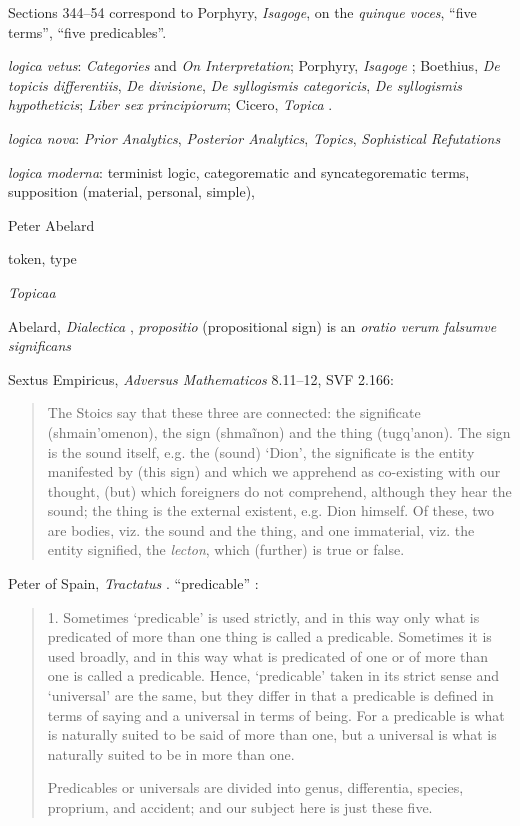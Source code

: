 \documentclass{article}
\newcommand{\textgreek}[1]{\begingroup\fontencoding{LGR}\selectfont#1\endgroup}
\begin{document}
Sections 344--54 correspond to Porphyry, {\em Isagoge}, on the {\em quinque voces}, ``five terms'', ``five predicables''.










{\em logica vetus}: {\em Categories} and {\em On Interpretation}; Porphyry, {\em Isagoge} \cite{isagoge}; Boethius, {\em De topicis differentiis},
{\em De divisione}, {\em De syllogismis categoricis}, {\em De syllogismis hypotheticis}; {\em Liber sex principiorum};  Cicero, {\em Topica} \cite{reinhardt}.

{\em logica nova}: {\em Prior Analytics}, {\em Posterior Analytics}, {\em Topics}, {\em Sophistical Refutations}

{\em logica moderna}: terminist logic, categorematic and syncategorematic terms, supposition (material, personal, simple),

Peter Abelard

token, type

{\em Topicaa} 




Abelard, {\em Dialectica} \cite[p.~153]{dialectica}, {\em propositio} (propositional sign) is an {\em oratio verum falsumve significans}


Sextus Empiricus, {\em Adversus Mathematicos} 8.11--12, SVF 2.166:

\begin{quote}
The Stoics say that these three are connected: the
significate (\textgreek{shmain'omenon}), the sign (\textgreek{shma\~inon}) and the thing
(\textgreek{tugq'anon}). The sign is the sound itself, e.g. the (sound) `Dion',
the significate is the entity manifested by (this sign) and which we apprehend as co-existing with our thought, (but) which
foreigners do not comprehend, although they hear the sound;
the thing is the external existent, e.g. Dion himself. Of these,
two are bodies, viz. the sound and the thing, and one immaterial,
viz. the entity signified, the {\em lecton}, which (further) is true or false.
\end{quote}

Peter of Spain, {\em Tractatus} \cite[pp.~79--101]{CTMPT}. ``predicable'' \cite[pp.~80--81]{CTMPT}:

\begin{quote}
1. Sometimes `predicable' is used strictly, and in this way only what is predicated of more than one thing is called a predicable. Sometimes it is used broadly, and in this way what is predicated of one or of more than one is called a predicable. Hence, `predicable' taken in its strict sense and `universal' are the same, but
they differ in that a predicable is defined in terms of saying and a universal in terms of being. For a predicable is what is naturally suited to be said of more than one, but a universal is what is
naturally suited to be in more than one.

Predicables or universals are divided into genus, differentia, species, proprium, and accident; and our subject here is just these five.
\end{quote}
\end{document}
